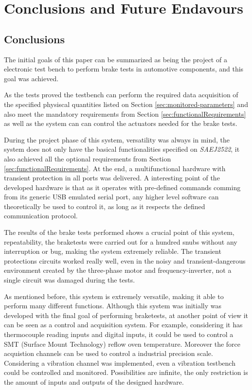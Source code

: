 \chapter{Conclusions and Future Endavours}\label{ch:conclusions-and-future-endavours}
	
	\section{Conclusions}\label{sec:conclusions}

		The initial goals of this paper can be summarized as being the project of a electronic test bench to perform brake tests in automotive components, and this goal was achieved.
		\par
		As the tests proved the testbench can perform the required data acquisition of the specified physiscal quantities listed on Section \ref{sec:monitored-parameters} and also meet the mandatory requirements from Section \ref{sec:functionalRequirements} as well as the system can can control the actuators needed for the brake tests.
		\par
		During the project phase of this system, versatility was always in mind, the system does not only have the basical functionalities specified on \textit{SAEJ2522}, it also achieved all the optional requirements from Section \ref{sec:functionalRequirements}. At the end, a multifunctional hardware with transient protection in all ports was delivered. A interesting point of the developed hardware is that as it operates with pre-defined commands comming from its generic USB emulated serial port, any higher level software can theoretically be used to control it, as long as it respects the defined communication protocol.
		\par
		The results of the brake tests performed shows a crucial point of this system, repeatability, the braketests were carried out for a hundred snubs without any interruption or bug, making the system extremely reliable. The transient protections circuits worked really well, even in the noisy and transient-dangerous environment created by the three-phase motor and frequency-inverter, not a single circuit was damaged during the tests.
		\par
		As mentioned before, this system is extremely versatile, making it able to perform many different functions. Although this system was initially was developed with the final goal of performing braketests, at another point of view it can be seen as a control and acquisition system. For example, considering it has thermocouple reading inputs and digital inputs, it could be used to control a SMT (Surface Mount Technology)  reflow oven temperature. Moreover the force acquistion channels can be used to control a industrial precision scale. Considering a vibration channel was implemented, even a vibration testbench could be controlled and monitored. Possibilities are infinite, the only restriction is the amount of inputs and outputs of the designed hardware.

